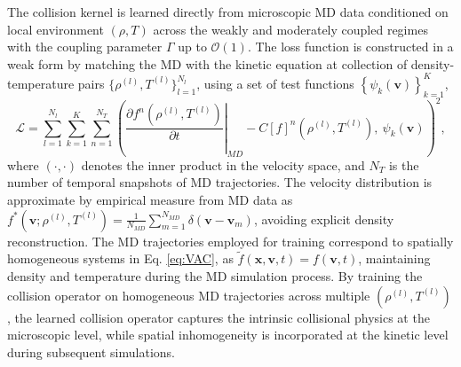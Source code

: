 \documentclass[preprint,1p,times]{elsarticle}
\newcommand{\cO}{\mathcal{O}}
\theoremstyle{definition}
\theoremstyle{remark}
\begin{document}
The collision kernel is learned directly from microscopic MD data conditioned on local environment $(\rho,T)$ across the weakly and moderately coupled regimes with the coupling parameter $\Gamma$ up to $\cO(1)$.
The loss function is constructed in a weak form by matching the MD with the kinetic equation at collection of density-temperature pairs $\{\rho^{(l)}, T^{(l)}\}_{l=1}^{N_{l}}$, using a set of test functions $\left \{\psi_k(\bm{v})\right\}_{k=1}^{K}$,
\begin{equation*}
    \mathcal{L}= \sum_{l=1}^{N_l} \sum_{k=1}^K \sum_{n=1}^{N_T} \left(\left.\dfrac{\partial f^{n} (\rho^{(l)}, T^{(l)})}{\partial t}\right|_{MD} - C[f]^{n} (\rho^{(l)}, T^{(l)}), ~ \psi_k(\bm{v})\right)^2 ,
\end{equation*}
where $(\cdot, \cdot)$ denotes the inner product in the velocity space, and $N_T$ is the number of temporal snapshots of MD trajectories. 
The velocity distribution is approximate by empirical measure from MD data as $f^{\ast}(\bm{v}; \rho^{(l)}, T^{(l)}) = \frac{1}{N_{MD}}\sum_{m=1}^{N_{MD}} \delta(\bm{v}-\bm{v}_m)$, avoiding explicit density reconstruction.
The MD trajectories employed for training correspond to spatially homogeneous systems in Eq. \eqref{eq:VAC}, as $\tilde{f}(\bm{x},\bm{v},t) = f(\bm{v},t)$, maintaining density and temperature during the MD simulation process.
By training the collision operator on homogeneous MD trajectories across multiple $(\rho^{(l)}, T^{(l)})$, the learned collision operator captures the intrinsic collisional physics at the microscopic level, while spatial inhomogeneity is incorporated at the kinetic level during subsequent simulations.
\end{document}
